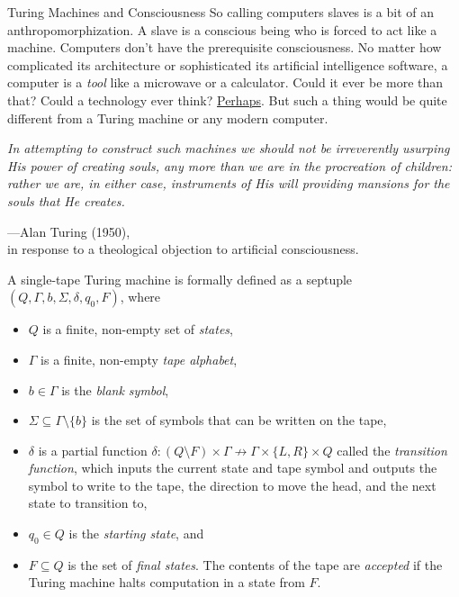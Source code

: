 \begin{bluebox}{Turing Machines and Consciousness}
    So calling computers slaves is a bit of an anthropomorphization. A slave is a conscious being who is forced to act like a machine. Computers don't have the prerequisite consciousness. No matter how complicated its architecture or sophisticated its artificial intelligence software, a computer is a \textit{tool} like a microwave or a calculator. Could it ever be more than that? Could a technology ever think? \underline{Perhaps}. But such a thing would be quite different from a Turing machine or any modern computer. \\

        
    \parbreak
        
    \begin{displayquote}
        \textit{In attempting to construct such machines we should not be irreverently usurping His power of creating souls, any more than we are in the procreation of children: rather we are, in either case, instruments of His will providing mansions for the souls that He creates.}
        \vspace{4mm}
        \begin{flushright}
            ---Alan Turing (1950), \\
            in response to a theological objection to artificial consciousness.
        \end{flushright}
    \end{displayquote}

\end{bluebox}

A single-tape Turing machine is formally defined as a septuple $(Q,\Gamma,b,\Sigma,\delta,q_0,F)$, where

\begin{itemize}
    \item $Q$ is a finite, non-empty set of \textit{states},
    \item $\Gamma$ is a finite, non-empty \textit{tape alphabet},
    \item $b\in\Gamma$ is the \textit{blank symbol},
    \item $\Sigma\subseteq\Gamma\setminus \{b\}$ is the set of symbols that can be written on the tape,
    \item $\delta$ is a partial function $\delta : (Q\setminus F)\times\Gamma\nrightarrow \Gamma\times\{L,R\}\times Q$ called the \textit{transition function}, which inputs the current state and tape symbol and outputs the symbol to write to the tape, the direction to move the head, and the next state to transition to,
    \item $q_0\in Q$ is the \textit{starting state}, and
    \item $F\subseteq Q$ is the set of \textit{final states}. The contents of the tape are \textit{accepted} if the Turing machine halts computation in a state from $F$.
\end{itemize}

